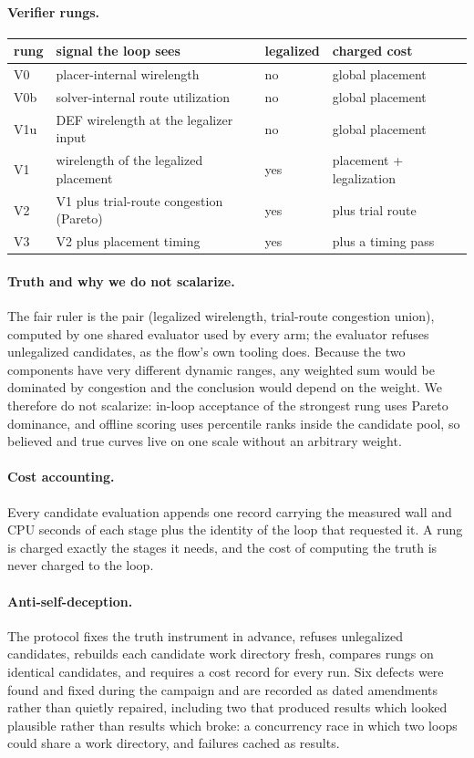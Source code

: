 \documentclass{article}
\begin{document}
\paragraph{Verifier rungs.}
\begin{center}
\begin{tabular}{llll}
\toprule
rung & signal the loop sees & legalized & charged cost \\
\midrule
V0 & placer-internal wirelength & no & global placement \\
V0b & solver-internal route utilization & no & global placement \\
V1u & DEF wirelength at the legalizer input & no & global placement \\
V1 & wirelength of the legalized placement & yes & placement + legalization \\
V2 & V1 plus trial-route congestion (Pareto) & yes & plus trial route \\
V3 & V2 plus placement timing & yes & plus a timing pass \\
\bottomrule
\end{tabular}
\end{center}

\paragraph{Truth and why we do not scalarize.} The fair ruler is the pair (legalized
wirelength, trial-route congestion union), computed by one shared evaluator used by
every arm; the evaluator refuses unlegalized candidates, as the flow's own tooling
does. Because the two components have very different dynamic ranges, any weighted sum
would be dominated by congestion and the conclusion would depend on the weight. We
therefore do not scalarize: in-loop acceptance of the strongest rung uses Pareto
dominance, and offline scoring uses percentile ranks inside the candidate pool, so
believed and true curves live on one scale without an arbitrary weight.

\paragraph{Cost accounting.} Every candidate evaluation appends one record carrying
the measured wall and CPU seconds of each stage plus the identity of the loop that
requested it. A rung is charged exactly the stages it needs, and the cost of computing
the truth is never charged to the loop.

\paragraph{Anti-self-deception.} The protocol fixes the truth instrument in advance,
refuses unlegalized candidates, rebuilds each candidate work directory fresh, compares
rungs on identical candidates, and requires a cost record for every run. Six defects
were found and fixed during the campaign and are recorded as dated amendments rather
than quietly repaired, including two that produced results which looked plausible
rather than results which broke: a concurrency race in which two loops could share a
work directory, and failures cached as results.
\end{document}
